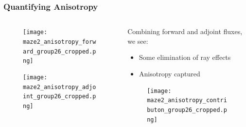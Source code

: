 \documentclass[handout]{beamer}
\renewcommand{\(}{\begin{columns}}
\renewcommand{\)}{\end{columns}}
\newcommand{\<}[1]{\begin{column}{#1}}
\renewcommand{\>}{\end{column}}
\begin{document}
%
\begin{frame}[fragile]
  \frametitle{Quantifying Anisotropy}
  
    \begin{columns}
    \begin{column}{0.5\textwidth}
  	\begin{figure}
  	\begin{center}
  		\texttt{[image: maze2\_anisotropy\_forward\_group26\_cropped.png]}
	\end{center}
  	\end{figure}
  	  \begin{figure}
  	\begin{center}
  		\texttt{[image: maze2\_anisotropy\_adjoint\_group26\_cropped.png]}
	\end{center}
  	\end{figure}
    \end{column}
  \pause
    \begin{column}{0.5\textwidth}
    Combining forward and adjoint fluxes, we see:
    \begin{itemize}
        \item Some elimination of ray effects
        \item Anisotropy captured 
    \end{itemize}
  	\begin{figure}
  	\begin{center}
  		\texttt{[image: maze2\_anisotropy\_contributon\_group26\_cropped.png]}
	\end{center}
  	\end{figure}
  	\end{column}  
  \end{columns}
\end{frame}

\end{document}
